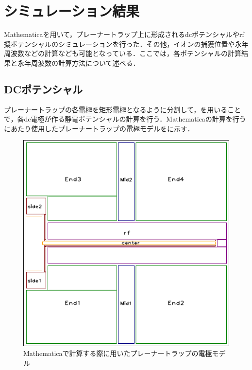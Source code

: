 \chapter{シミュレーション結果}\label{simulation}
Mathematicaを用いて，プレーナートラップ上に形成されるdcポテンシャルやrf擬ポテンシャルのシミュレーションを行った．その他，イオンの捕獲位置や永年周波数などの計算なども可能となっている．ここでは，各ポテンシャルの計算結果と永年周波数の計算方法について述べる．
\section{DCポテンシャル}
プレーナートラップの各電極を矩形電極となるように分割して，を用いることで，各dc電極が作る静電ポテンシャルの計算を行う．Mathematicaの計算を行うにあたり使用したプレーナートラップの電極モデルをに示す．

\begin{figure}[h]
	\begin{center}
		\includegraphics[width = 0.4\linewidth]{./simulation/figure/named_rect_electrode.png}
	\end{center}
	\caption{Mathematicaで計算する際に用いたプレーナートラップの電極モデル}
	\label{fig:rect_electrode}
\end{figure}

